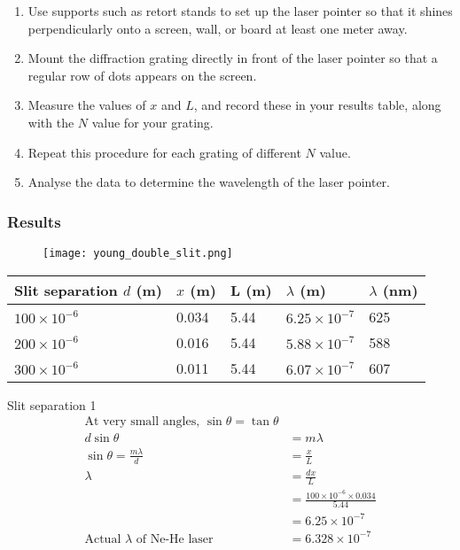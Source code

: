\documentclass{report}
\begin{document}
			\begin{enumerate}
				\item Use supports such as retort stands to set up the laser pointer so that it shines perpendicularly onto a screen, wall, or board at least one meter away.
				\item Mount the diffraction grating directly in front of the laser pointer so that a regular row of dots appears on the screen.
				\item Measure the values of $x$ and $L$, and record these in your results table, along with the $N$ value for your grating.
				\item Repeat this procedure for each grating of different $N$ value.
				\item Analyse the data to determine the wavelength of the laser pointer.
			\end{enumerate}

		\subsubsection{Results}

			\begin{figure}[H]
				\centering
				\texttt{[image: young\_double\_slit.png]}
			\end{figure}

			\begin{table}[H]
				\centering
				\begin{tabular}{p{4cm}|p{2cm}|p{2cm}|p{2cm}|p{2cm}}
					Slit separation $d$ (m)		& $x$ (m)	& L (m)		& $\lambda$ (m) 		& $\lambda$ (nm)	\\ \hline
					$100 \times 10^{-6}$		& 0.034		& 5.44		& $6.25 \times 10^{-7}$		& 625			\\
					$200 \times 10^{-6}$		& 0.016		& 5.44		& $5.88 \times 10^{-7}$		& 588			\\
					$300 \times 10^{-6}$		& 0.011		& 5.44		& $6.07 \times 10^{-7}$		& 607			\\
				\end{tabular}
			\end{table}
			
			Slit separation 1
			\begin{align*}
				\text{At very small angles, } \sin{\theta} = \tan{\theta} \\
				d \sin{\theta} &= m \lambda \\
				\sin{\theta} = \frac{m \lambda}{d} &= \frac{x}{L} \\
				\lambda &= \frac{dx}{L} \\
					&= \frac{100 \times 10^{-6} \times 0.034}{5.44} \\
					&= 6.25 \times 10^{-7} \\
			\text{Actual $\lambda$ of Ne-He laser} &= 6.328 \times 10^{-7}
			\end{align*}
\end{document}
